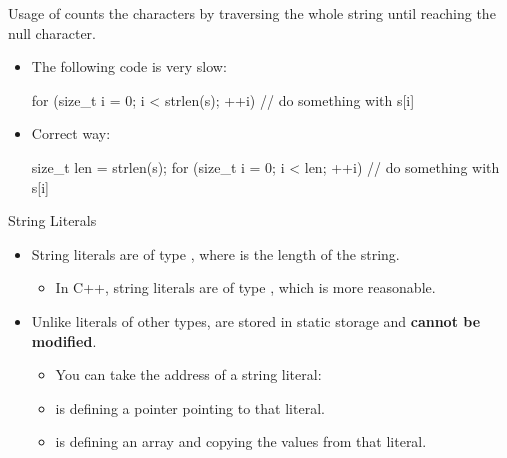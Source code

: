 \documentclass[handout]{beamer}
\begin{document}
\begin{frame}[fragile]{Usage of }
     counts the characters by traversing the whole string until reaching the null character.
    \begin{itemize}
        \item The following code is very slow:
        \begin{cpp}
for (size_t i = 0; i < strlen(s); ++i)
  // do something with s[i]
        \end{cpp}
        \pause
        \item Correct way:
        \begin{cpp}
size_t len = strlen(s);
for (size_t i = 0; i < len; ++i)
  // do something with s[i]
        \end{cpp}
    \end{itemize}
\end{frame}

\begin{frame}{String Literals}
    \begin{itemize}
        \item String literals are of type , where  is the length of the string.
        \begin{itemize}
            \item In C++, string literals are of type , which is more reasonable.
        \end{itemize}
        \pause
        \item Unlike literals of other types,  are stored in static storage and \textbf{cannot be modified}.
        \begin{itemize}
            \item You can take the address of a string literal:\\
            \pause
            \item {} is defining a pointer pointing to that literal.
            \item {} is defining an array and copying the values from that literal.
        \end{itemize}
    \end{itemize}
\end{frame}
\end{document}
